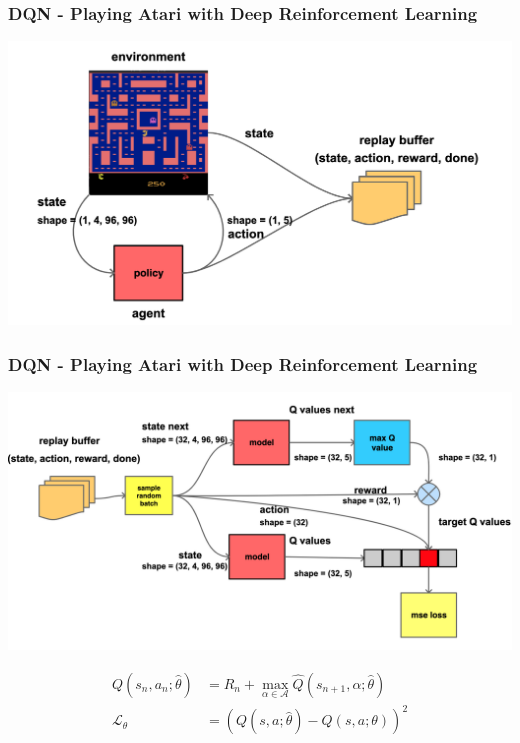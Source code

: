 \documentclass{beamer}
\begin{document}
\begin{frame}
  \frametitle{DQN - Playing Atari with Deep Reinforcement Learning} 

  \centering
  \includegraphics[scale=0.18]{../diagrams/basic/dqn1.png}
\end{frame}

\begin{frame}
  \frametitle{DQN - Playing Atari with Deep Reinforcement Learning} 

  \centering
  \includegraphics[scale=0.1]{../diagrams/basic/dqn2.png}

    \begin{align*}
    Q(s_{n}, a_{n}; \hat{\theta}) &= R_{n} + \max_{\alpha \in \mathcal{A}} \hat{Q}(s_{n+1}, \alpha; \hat{\theta}) \\
    \mathcal{L_{\theta}} &= (Q(s, a; \hat{\theta}) - Q(s, a; \theta))^2
  \end{align*} 
  
\end{frame}
\end{document}
